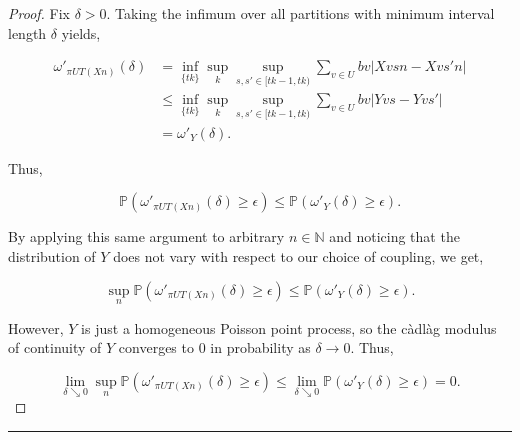 \documentclass[12pt]{article}
\newcommand{\mb}{\mathbb}
\newcommand{\ra}{\rightarrow}
\newcommand{\ep}{\epsilon}
\newcommand{\lin}{\rule{\linewidth}{0.4 pt}}
\newcommand{\pr}{\mb{P}}							%
\renewcommand{\v}{v}							%
\renewcommand{\U}{U}							%
\renewcommand{\b}{b}							%
\newcommand{\T}{T}								%
\renewcommand{\t}{t}							%
\newcommand{\proj}{\pi}							%
\renewcommand{\tt}{s}							%
\newcommand{\ttt}{s'}							%
\newcommand{\X}{X}								%
\newcommand{\XX}{Y}								%
\renewcommand{\it}{k}							%
\begin{document}
\begin{proof}
Fix \(\delta > 0\). Taking the infimum over all partitions with minimum interval length \(\delta\) yields,

\begin{align*}
\omega'_{\proj{\U}{\T}\left(\X{}{}{n}\right)}(\delta) &= \inf_{\{\t{\it}\}}\sup_\it\sup_{\tt,\ttt \in [\t{\it-1},\t{\it})} \sum_{\v\in \U} \b{\v}|\X{\v}{\tt}{n} - \X{\v}{\ttt}{n}|\\
&\leq \inf_{\{\t{\it}\}}\sup_\it\sup_{\tt,\ttt \in [\t{\it-1},\t{\it})} \sum_{\v\in \U} \b{\v}|\XX{\v}{\tt} - \XX{\v}{\ttt}|\\
&= \omega'_{\XX{}{}}(\delta).
\end{align*}

Thus,

\[\pr\left(\omega'_{\proj{\U}{\T}\left(\X{}{}{n}\right)}(\delta) \geq \ep\right) \leq \pr\left(\omega'_{\XX{}{}}(\delta) \geq \ep\right).\]

By applying this same argument to arbitrary \(n\in \mb{N}\) and noticing that the distribution of \(\XX{}{}\) does not vary with respect to our choice of coupling, we get,

\[\sup_{n}\pr\left(\omega'_{\proj{\U}{\T}\left(\X{}{}{n}\right)}(\delta)\geq \ep\right) \leq \pr\left(\omega'_{\XX{}{}}(\delta) \geq \ep\right).\]

However, \(\XX{}{}\) is just a homogeneous Poisson point process, so the c\`adl\`ag modulus of continuity of \(\XX{}{}\) converges to 0 in probability as \(\delta \ra 0\). Thus,

\[\lim_{\delta \searrow 0}\sup_{n}\pr\left(\omega'_{\proj{\U}{\T}\left(\X{}{}{n}\right)}(\delta) \geq \ep\right) \leq \lim_{\delta\searrow 0}\pr\left(\omega'_{\XX{}{}}(\delta)\geq \ep\right) = 0.\]


\end{proof}

\lin
\end{document}
